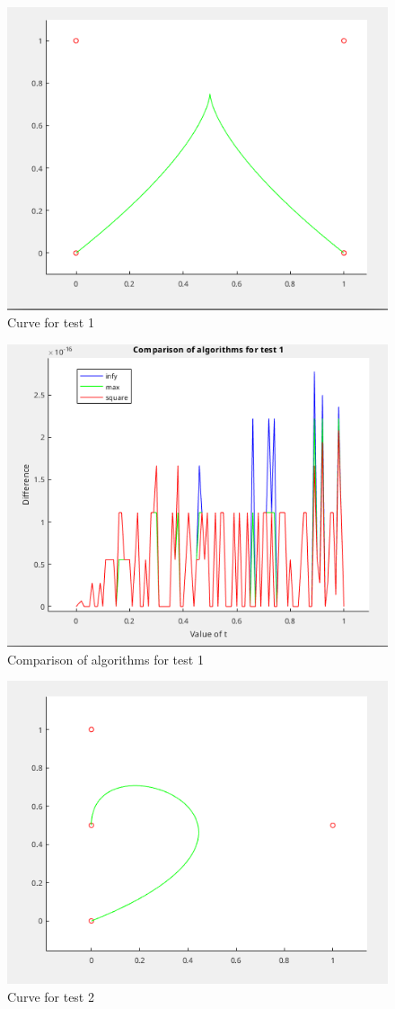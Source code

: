 \documentclass[]{article}
\begin{document}
\begin{figure}
  \centering
  \includegraphics[width=0.8\linewidth]{figs/01-curve.png}
  \caption{Curve for test 1}
  \label{fig:01-curve}
\end{figure}

\begin{figure}
  \centering
  \includegraphics[width=0.8\linewidth]{figs/01-diffs.png}
  \caption{Comparison of algorithms for test 1}
  \label{fig:01-diffs}
\end{figure}

\begin{figure}
  \centering
  \includegraphics[width=0.8\linewidth]{figs/02-curve.png}
  \caption{Curve for test 2}
  \label{fig:02-curve}
\end{figure}
\end{document}
